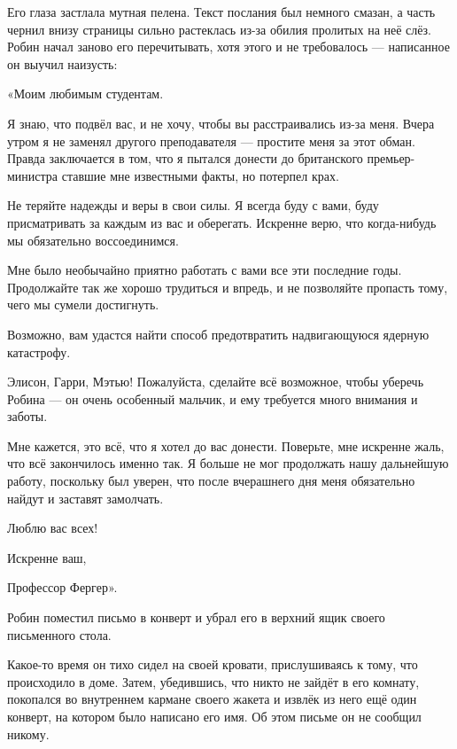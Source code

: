 \documentclass[a4paper,12pt]{book}
\begin{document}
\par
Его глаза застлала мутная пелена. Текст послания был немного смазан, а часть чернил внизу страницы сильно растеклась из-за обилия пролитых на неё слёз. Робин начал заново его перечитывать, хотя этого и не требовалось — написанное он выучил наизусть:\\
\par
«Моим любимым студентам.\\
\par
Я знаю, что подвёл вас, и не хочу, чтобы вы расстраивались из-за меня. Вчера утром я не заменял другого преподавателя — простите меня за этот обман. Правда заключается в том, что я пытался донести до британского премьер-министра ставшие мне известными факты, но потерпел крах.
\par
Не теряйте надежды и веры в свои силы. Я всегда буду с вами, буду присматривать за каждым из вас и оберегать. Искренне верю, что когда-нибудь мы обязательно воссоединимся.
\par
Мне было необычайно приятно работать с вами все эти последние годы. Продолжайте так же хорошо трудиться и впредь, и не позволяйте пропасть тому, чего мы сумели достигнуть.
\par
Возможно, вам удастся найти способ предотвратить надвигающуюся ядерную катастрофу.
\par
Элисон, Гарри, Мэтью! Пожалуйста, сделайте всё возможное, чтобы уберечь Робина — он очень особенный мальчик, и ему требуется много внимания и заботы.
\par
Мне кажется, это всё, что я хотел до вас донести. Поверьте, мне искренне жаль, что всё закончилось именно так. Я больше не мог продолжать нашу дальнейшую работу, поскольку был уверен, что после вчерашнего дня меня обязательно найдут и заставят замолчать.\\
\par
Люблю вас всех!\\
\par
Искренне ваш,\\
\par
Профессор Фергер».\\
\par
Робин поместил письмо в конверт и убрал его в верхний ящик своего письменного стола.
\par
Какое-то время он тихо сидел на своей кровати, прислушиваясь к тому, что происходило в доме. Затем, убедившись, что никто не зайдёт в его комнату, покопался во внутреннем кармане своего жакета и извлёк из него ещё один конверт, на котором было написано его имя. Об этом письме он не сообщил никому.
\end{document}
